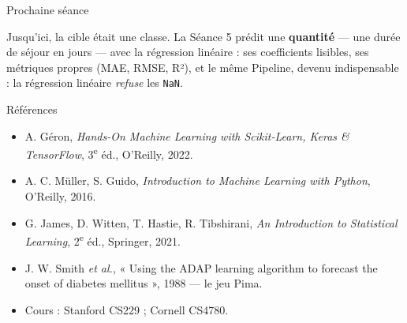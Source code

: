 \documentclass[aspectratio=169,11pt]{beamer}
\begin{document}
\begin{frame}{Prochaine séance}
\begin{ucadfront}
{\small Jusqu'ici, la cible était une classe. La Séance 5 prédit une \textbf{quantité} — une durée de séjour en jours — avec la régression linéaire : ses coefficients lisibles, ses métriques propres (MAE, RMSE, R²), et le même Pipeline, devenu indispensable : la régression linéaire \emph{refuse} les \texttt{NaN}.}
\end{ucadfront}
\end{frame}

\begin{frame}{Références}
\begin{itemize}\small
  \item A. Géron, \emph{Hands-On Machine Learning with Scikit-Learn, Keras \& TensorFlow}, 3\textsuperscript{e} éd., O'Reilly, 2022.
  \item A. C. Müller, S. Guido, \emph{Introduction to Machine Learning with Python}, O'Reilly, 2016.
  \item G. James, D. Witten, T. Hastie, R. Tibshirani, \emph{An Introduction to Statistical Learning}, 2\textsuperscript{e} éd., Springer, 2021.
  \item J. W. Smith \emph{et al.}, « Using the ADAP learning algorithm to forecast the onset of diabetes mellitus », 1988 — le jeu Pima.
  \item Cours : Stanford CS229 ; Cornell CS4780.
\end{itemize}
\end{frame}
\end{document}
